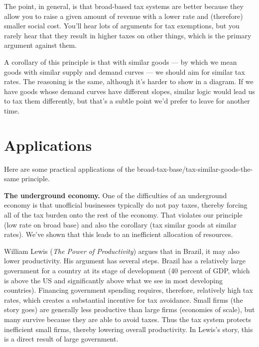 The point, in general, is that broad-based tax systems are better
because they allow you to raise a given amount of revenue with
a lower rate and (therefore) smaller social cost.
You'll hear lots of arguments for tax exemptions,
but you rarely hear that they result in higher taxes on other things,
which is the primary argument against them.

A corollary of this principle is that with similar goods ---
by which we mean goods with similar supply and demand curves --- we should aim for similar tax rates.
The reasoning is the same,
although it's harder to show in a diagram.
If we have goods whose demand curves have different slopes,
similar logic would lead us to tax them differently,
but that's a subtle point we'd prefer to leave for another time.



\section{Applications}

Here are some practical applications
of the broad-tax-base/tax-similar-goods-the-same principle.

\textbf{The underground economy. }
One of the difficulties of an underground economy is that
unofficial businesses typically do not pay taxes,
thereby forcing all of the tax burden onto the rest
of the economy.
That violates our principle (low rate on broad base) and also
the corollary (tax similar goods at similar rates).
We've shown that this leads to an inefficient allocation of resources.


William Lewis ({\it The Power of Productivity\/}) argues that in
Brazil, it may also lower productivity.
His argument has several steps.
Brazil has a relatively large government
for a country at its stage of development (40 percent of GDP, which
is above the US
and significantly above what we see in most developing countries).
Financing government spending requires, therefore,
relatively high tax rates,
which creates a substantial incentive for tax avoidance.
Small firms (the story goes) are generally less productive than large firms
(economies of scale),
but many survive because they are able to avoid taxes.
Thus the tax system protects inefficient small firms,
thereby lowering overall productivity.
In Lewis's story, this is a direct result of large government.


